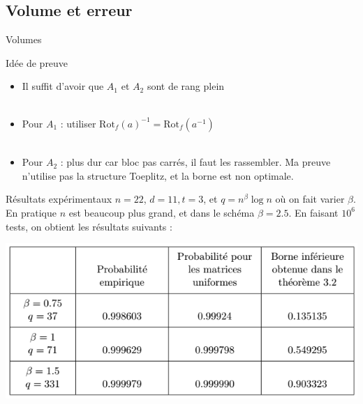\documentclass[10 pt, a4paper]{beamer}
\begin{document}
\subsection{Volume et erreur}
\begin{frame}{Volumes}
\end{frame}


\begin{frame}{Idée de preuve}
\begin{itemize}
\item<1->[•] Il suffit d'avoir que $A_1$ et $A_2$ sont de rang plein\\ ~ \\
\item<2->[•] Pour $A_1$ : utiliser $\text{Rot}_f(a)^{-1}=\text{Rot}_f(a^{-1})$\\ ~ \\
\item<3->[•] Pour $A_2$ : plus dur car bloc pas carrés, il faut les rassembler. Ma preuve n'utilise pas la structure Toeplitz, et la borne est non optimale.
\end{itemize}
\end{frame}


\begin{frame}{Résultats expérimentaux}
$n=22$, $d=11, t=3$, et $q=n^\beta\log{n}$ où on fait varier $\beta$. En pratique $n$ est beaucoup plus grand, et dans le schéma $\beta=2.5$. En faisant $10^6$ tests, on obtient les résultats suivants : \\

\begin{center}
\includegraphics[scale=0.40]{tab_exp.png}
\end{center}
\end{frame}
\end{document}
